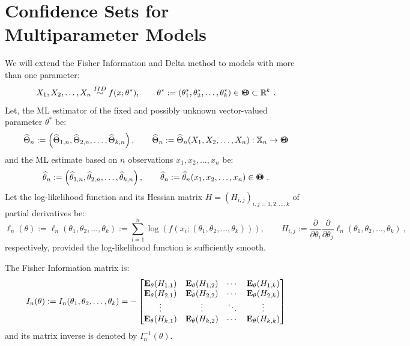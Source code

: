 \section{Confidence Sets for Multiparameter Models}\label{S:ConfSetsMultiParamModels}
We will extend the Fisher Information and Delta method to models with more than one parameter:
\[
X_1,X_2,\ldots,X_n \overset{IID}{\sim} f(x;\theta^*), \qquad \theta^* := (\theta_1^*, \theta_2^*, \ldots, \theta_k^*) \in \BB{\Theta} \subset \Rz^k  \ .
\]
Let, the ML estimator of the fixed and possibly unknown vector-valued parameter $\theta^*$ be:
\[
\widehat{\Theta}_n := \left( \widehat{\Theta}_{1,n}, \widehat{\Theta}_{2,n}, \ldots, \widehat{\Theta}_{k,n} \right), \qquad  \widehat{\Theta}_n := \widehat{\Theta}_n(X_1,X_2,\ldots,X_n) : \mathbb{X}_n \to {\Theta}\mspace{-11 mu}{\Theta}
\]
and the ML estimate based on $n$ observations $x_1,x_2,\ldots,x_n$ be:
\[
\widehat{\theta}_n := \left( \widehat{\theta}_{1,n}, \widehat{\theta}_{2,n}, \ldots, \widehat{\theta}_{k,n} \right), \qquad  \widehat{\theta}_n := \widehat{\theta}_n(x_1,x_2,\ldots,x_n) \in {\Theta}\mspace{-11 mu}{\Theta} \ .
\]
Let the log-likelihood function and its Hessian matrix $H = (H_{i,j})_{i,j=1,2,\ldots,k}$ of partial derivatives be:
\[
\ell_n(\theta) := \ell_n(\theta_1,\theta_2,\ldots,\theta_k) := \sum_{i=1}^n \log(f(x_i; (\theta_1,\theta_2,\ldots,\theta_k))), \qquad
H_{i,j} := \frac{\partial}{\partial \theta_i} \frac{\partial}{\partial \theta_j} \ell_n(\theta_1,\theta_2,\ldots,\theta_k) \ ,
\]
respectively, provided the log-likelihood function is sufficiently smooth.
\begin{definition}  The Fisher Information matrix is:
\begin{equation}\label{E:FisherInfoMat}
I_n(\theta) := I_n(\theta_1,\theta_2,\ldots,\theta_k) =
-
\begin{bmatrix}
\mathbf{E}_{\theta}(H_{1,1}) & \mathbf{E}_{\theta}(H_{1,2}) & \cdots & \mathbf{E}_{\theta}(H_{1,k}) \\
\mathbf{E}_{\theta}(H_{2,1}) & \mathbf{E}_{\theta}(H_{2,2}) & \cdots & \mathbf{E}_{\theta}(H_{2,k}) \\
\vdots & \vdots & \ddots & \vdots \\
\mathbf{E}_{\theta}(H_{k,1}) & \mathbf{E}_{\theta}(H_{k,2}) & \cdots & \mathbf{E}_{\theta}(H_{k,k})
\end{bmatrix}
\end{equation}
and its matrix inverse is denoted by $I_n^{-1}(\theta)$.
\end{definition}
